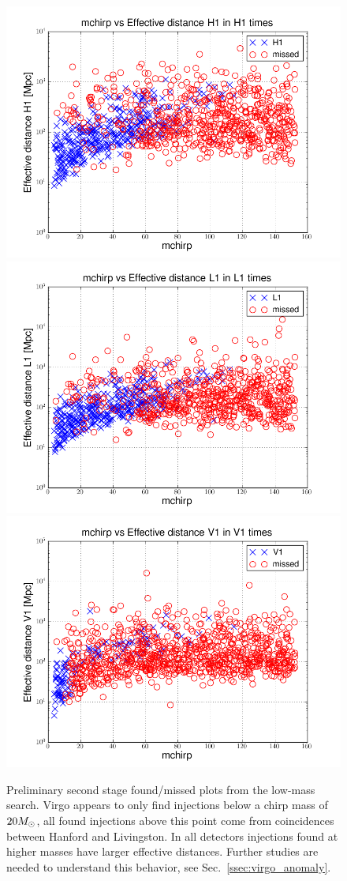 \begin{figure}
  \includegraphics[width=0.5\linewidth]{figures/ninja2_results/H1-plotinspmissed_LOW_FULL_DATA_mchirp-eff_dist-log-H1-871147552-5209912} 
  \includegraphics[width=0.5\linewidth]{figures/ninja2_results/L1-plotinspmissed_LOW_FULL_DATA_mchirp-eff_dist-log-L1-871147552-5209912} \\
  \includegraphics[width=0.5\linewidth]{figures/ninja2_results/V1-plotinspmissed_LOW_FULL_DATA_mchirp-eff_dist-log-V1-871147552-5209912} \\
  \caption[Second stage found/missed plots from the low-mass search]{
  \label{f:ninja2_cbc_results_low_second}
Preliminary second stage found/missed plots from
the low-mass search.  Virgo appears to only find injections below a
chirp mass of $20 M_\odot$, all found injections above this point come
from coincidences between Hanford and Livingston.  In all detectors
injections found at higher masses have larger effective distances.
Further studies are needed to understand this behavior, see
Sec.~\ref{ssec:virgo_anomaly}.
}
\end{figure}%

